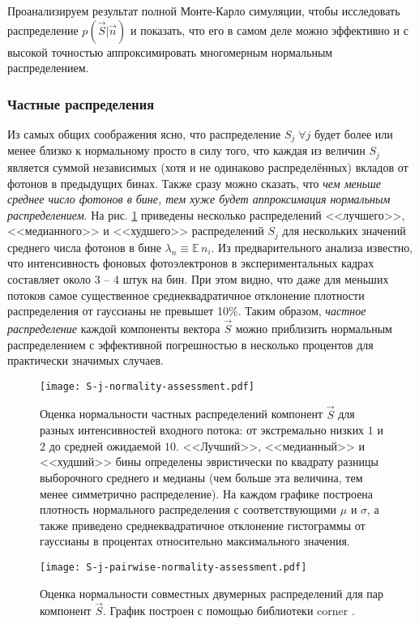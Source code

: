 Проанализируем результат полной Монте-Карло симуляции, чтобы исследовать распределение $p(\vec{S} | \vec{n})$ и показать, что его в самом деле можно эффективно и с высокой точностью аппроксимировать многомерным нормальным распределением.

\subsubsection{Частные распределения}

Из самых общих соображения ясно, что распределение $S_j \; \forall j$ будет более или менее близко к нормальному просто в силу того, что каждая из величин $S_j$ является суммой независимых (хотя и не одинаково распределённых) вкладов от фотонов в предыдущих бинах. Также сразу можно сказать, что \textit{чем меньше среднее число фотонов в бине, тем хуже будет аппроксимация нормальным распределением}. На рис. \ref{pic:s-j-norm-assess} приведены несколько распределений <<лучшего>>, <<медианного>> и <<худшего>> распределений $S_j$ для нескольких значений среднего числа фотонов в бине $\lambda_n \equiv \mathbb{E} \, n_i$. Из предварительного анализа известно, что интенсивность фоновых фотоэлектронов в экспериментальных кадрах составляет около $3$ -- $4$ штук на бин. При этом видно, что даже для меньших потоков самое существенное среднеквадратичное отклонение плотности распределения от гауссианы не превышет 10\%. Таким образом, \textit{частное распределение} каждой компоненты вектора $\vec{S}$ можно приблизить нормальным распределением с эффективной погрешностью в несколько процентов для практически значимых случаев.

\begin{figure}
	\centering
	\texttt{[image: S-j-normality-assessment.pdf]}
	\caption{Оценка нормальности частных распределений компонент $\vec{S}$ для разных интенсивностей входного потока: от экстремально низких $1$ и $2$ до средней ожидаемой $10$. <<Лучший>>, <<медианный>> и <<худший>> бины определены эвристически по квадрату разницы выборочного среднего и медианы (чем больше эта величина, тем менее симметрично распределение). На каждом графике построена плотность нормального распределения с соответствующими $\mu$ и $\sigma$, а также приведено среднеквадратичное отклонение гистограммы от гауссианы в процентах относительно максимального значения.}
	\label{pic:s-j-norm-assess}
\end{figure}

\begin{figure}
	\centering
	\texttt{[image: S-j-pairwise-normality-assessment.pdf]}
	\caption{Оценка нормальности совместных двумерных распределений для пар компонент $\vec{S}$. График построен с помощью библиотеки corner \cite{ForemanMackey2016}.}
	\label{pic:s-j-pairwise-norm-assess}
\end{figure}

